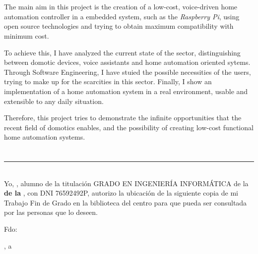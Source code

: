 \\

\vspace{0.7cm}
\\

The main aim in this project is the creation of a low-cost, voice-driven home automation controller in a embedded system, such 
as the \textit{Raspberry Pi}, using open source technologies and trying to obtain maximum compatibility with minimum cost.

\bigskip
To achieve this, I have analyzed the current state of the sector, distinguishing between domotic devices, voice assistants
and home automation oriented sytems. Through Software Engineering, I have stuied the possible necessities of the users, trying
to make up for the scarcities in this sector. Finally, I show an implementation of a home automation system in a real environment,
usable and extensible to any daily situation.

\bigskip
Therefore, this project tries to demonstrate the infinite opportunities that the recent field of domotics enables, and the possibility
of creating low-cost functional home automation systems. 

\chapter*{}
\thispagestyle{empty}

\noindent\rule[-1ex]{\textwidth}{2pt}\\[4.5ex]

Yo, \textbf{\myName}, alumno de la titulación GRADO EN INGENIERÍA INFORMÁTICA de la \textbf{\myFaculty de la \myUni}, 
con DNI 76592492P, autorizo la ubicación de la siguiente copia de mi Trabajo Fin de Grado en la biblioteca del centro 
para que pueda ser consultada por las personas que lo deseen.

\vspace{6cm}

\noindent Fdo: \myName

\vspace{2cm}

\begin{flushright}
\myLocation, a \myTime
\end{flushright}


\chapter*{}
\thispagestyle{empty}

